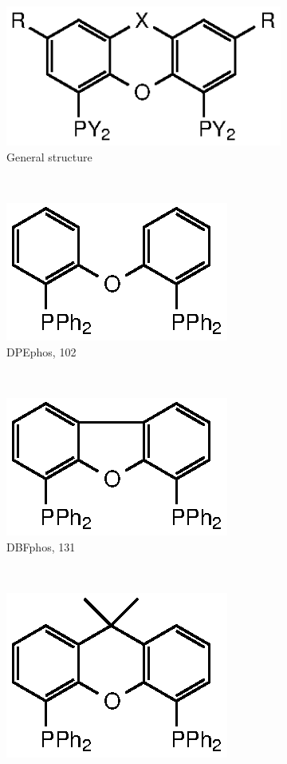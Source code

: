 \begin{figure}[htbp]
\centering
\begin{subfigure}[b]{0.35\textwidth}
	\centering
	\includegraphics{../Figures/Xantphosderivatives/Generic.eps}
	\caption{General structure}
	\label{genericxantphos}
\end{subfigure}
~
\begin{subfigure}[b]{0.3\textwidth}
	\centering
	\includegraphics{../Figures/Xantphosderivatives/DPEphos.eps}
	\caption{DPEphos, 102\degrees}
	\label{DPEphos}
\end{subfigure}
~
\begin{subfigure}[b]{0.3\textwidth}
	\centering
	\includegraphics{../Figures/Xantphosderivatives/DBFphos.eps}
	\caption{DBFphos, 131\degrees}
	\label{DBFphos}
\end{subfigure}
\\
\vspace{0.5cm}
\begin{subfigure}[b]{0.35\textwidth}
	\centering
	\includegraphics{../Figures/Xantphosderivatives/Phxantphos.eps}

\end{subfigure}
\end{figure}
